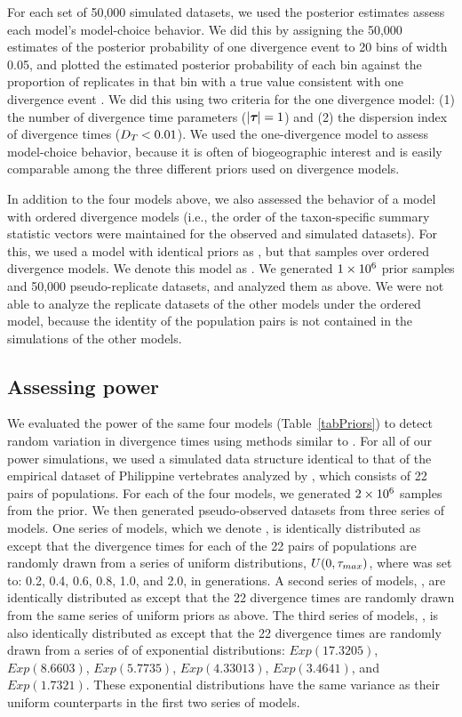 \documentclass[letterpaper,12pt]{article}
\begin{document}
\begin{linenumbers}
For each set of 50,000 simulated datasets, we used the posterior estimates
assess each model's model-choice behavior.
We did this by assigning the 50,000 estimates of the posterior probability
of one divergence event to 20 bins of width 0.05, and plotted
the estimated posterior probability of each bin against the proportion of
replicates in that bin with a true value consistent with one divergence
event \cite{Huelsenbeck2004,Oaks2012}.
We did this using two criteria for the one divergence model:
(1) the number of divergence time parameters ($\lvert \boldsymbol{\tau_{}} \rvert = 1$) and
(2) the dispersion index of divergence times ($D_{T_{}} < 0.01$).
We used the one-divergence model to assess model-choice behavior, because
it is often of biogeographic interest and is easily comparable among
the three different priors used on divergence models.

In addition to the four models above, we also assessed the behavior of a model
with ordered divergence models (i.e., the order of the taxon-specific summary
statistic vectors were maintained for the observed and simulated datasets).
For this, we used a model with identical priors as \modelDPP, but that samples
over ordered divergence models.
We denote this model as \modelDPPOrdered.
We generated $1\times 10^{6}$ prior samples and 50,000 pseudo-replicate datasets, and
analyzed them as above.
We were not able to analyze the replicate datasets of the other models under
the ordered model, because the identity of the population pairs is not
contained in the simulations of the other models.

\subsection*{Assessing power}
We evaluated the power of the same four models (Table~\ref{tabPriors}) to
detect random variation in divergence times using methods similar to
\citet{Oaks2012}.
For all of our power simulations, we used a simulated data structure identical
to that of the empirical dataset of Philippine vertebrates analyzed by
\citet{Oaks2012}, which consists of 22 pairs of populations.
For each of the four models, we generated $2\times 10^{6}$ samples from the prior.
We then generated pseudo-observed datasets from three series of models.
One series of models, which we denote \powerSeriesOld, is identically
distributed as \modelOld except that the divergence times for each of the 22
pairs of populations are randomly drawn from a series of uniform distributions,
$U(0, \tau_{max})$, where  was set to: 0.2, 0.4, 0.6, 0.8, 1.0, and
2.0, in \globalcoalunit generations.
A second series of models, \powerSeriesUniform, are identically distributed as
\modelUniform except that the 22 divergence times are randomly drawn from the
same series of uniform priors as above.
The third series of models, \powerSeriesUniformExp, is also identically
distributed as \modelUniform except that the 22 divergence times are randomly
drawn from a series of of exponential distributions: $Exp(17.3205)$,
$Exp(8.6603)$, $Exp(5.7735)$, $Exp(4.33013)$, $Exp(3.4641)$, and $Exp(1.7321)$.
These exponential distributions have the same variance as their uniform
counterparts in the first two series of models.


\end{linenumbers}
\end{document}

